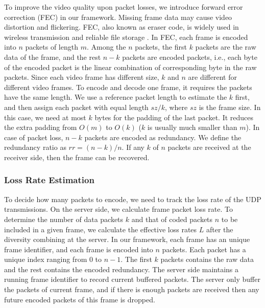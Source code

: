 To improve the video quality upon packet losses, 
we introduce forward error correction (FEC) in our framework. 
Missing frame data may cause video distortion and flickering.
FEC, also known as eraser code, is widely used in wireless transmission \cite{yu2014can}
and reliable file storage \cite{plank2009performance}.
In FEC, each frame is encoded into $n$ packets of length $m$. 
Among the $n$ packets, the first $k$ packets are the raw data
of the frame, and the rest $n - k$ packets are encoded packets, 
i.e., each byte of the encoded packet is the linear combination 
of corresponding byte in the raw packets. 
Since each video frame has different size, $k$ and $n$ are 
different for different video frames. 
To encode and decode one frame, 
it requires the packets have the same length.
We use a reference packet length to estimate the $k$ first, 
and then assign each packet with equal length $sz / k$, 
where $sz$ is the frame size. 
In this case, we need at most $k$ bytes for the
padding of the last packet. 
It reduces the extra padding from $O(m)$ to $O(k)$ ($k$ is usually much smaller than $m$).  
In case of packet loss, $n - k$ packets are encoded as redundancy.
We define the redundancy ratio as $rr = (n - k) / n$. 
If any $k$ of $n$ packets are received at the receiver side,
then the frame can be recovered. 

\subsubsection{Loss Rate Estimation}
\label{sec_lossrate}

To decide how many packets to encode, we need to track
the loss rate of the UDP transmissions. 
On the server side, we calculate frame packet loss rate. 
To determine the number of data packets $k$ and that of coded packets $n$
to be included in a given frame, we
calculate the effective loss rates $L$ after the diversity combining at
the server. 
In our framework, each frame has an unique frame identifier, 
and each frame is encoded into $n$ packets. 
Each packet has a unique index ranging from $0$ to $n - 1$. 
The first $k$ packets contains the raw data and the rest
contains the encoded redundancy.
The server side maintains a running frame identifier to record
current buffered packets. 
The server only buffer the packets of current frame, 
and if there is enough packets are received then
any future encoded packets of this frame is dropped. 

